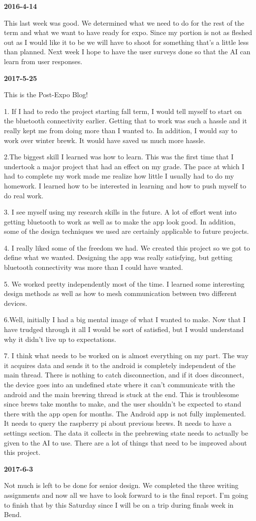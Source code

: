 \textbf{2016-4-14} 

This last week was good. We determined what we need to do for the rest of the term and what we want to have ready for expo. Since my portion is not as fleshed out as I would like it to be we will have to shoot for something that's a little less than planned. Next week I hope to have the user surveys done so that the AI can learn from user responses.

\textbf{2017-5-25} 

This is the Post-Expo Blog!

1. If I had to redo the project starting fall term, I would tell myself to start on the bluetooth connectivity earlier. Getting that to work was such a hassle and it really kept me from doing more than I wanted to. In addition, I would say to work over winter brewk. It would have saved us much more hassle.

2.The biggest skill I learned was how to learn. This was the first time that I undertook a major project that had an effect on my grade. The pace at which I had to complete my work made me realize how little I usually had to do my homework. I learned how to be interested in learning and how to push myself to do real work.

3. I see myself using my research skills in the future. A lot of effort went into getting bluetooth to work as well as to make the app look good. In addition, some of the design techniques we used are certainly applicable to future projects.

4. I really liked some of the freedom we had. We created this project so we got to define what we wanted. Designing the app was really satisfying, but getting bluetooth connectivity was more than I could have wanted.

5. We worked pretty independently most of the time. I learned some interesting design methods as well as how to mesh communication between two different devices.

6.Well, initially I had a big mental image of what I wanted to make. Now that I have trudged through it all I would be sort of satisfied, but I would understand why it didn't live up to expectations.

7. I think what needs to be worked on is almost everything on my part. The way it acquires data and sends it to the android is completely independent of the main thread. There is nothing to catch disconnection, and if it does disconnect, the device goes into an undefined state where it can't communicate with the android and the main brewing thread is stuck at the end. This is troublesome since brews take months to make, and the user shouldn't be expected to stand there with the app open for months. The Android app is not fully implemented. It needs to query the raspberry pi about previous brews. It needs to have a settings section. The data it collects in the prebrewing state needs to actually be given to the AI to use. There are a lot of things that need to be improved about this project.

\textbf{2017-6-3} 

Not much is left to be done for senior design. We completed the three writing assignments and now all we have to look forward to is the final report. I'm going to finish that by this Saturday since I will be on a trip during finals week in Bend.
